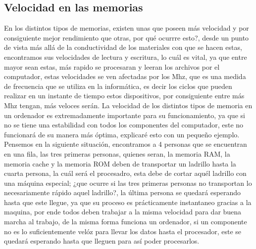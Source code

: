 \documentclass{article}
\begin{document}
\subsection{Velocidad en las memorias} 
En los distintos tipos de memorias, existen unas que poseen más velocidad y por consiguiente mejor rendimiento que otras, por qué ocurrre esto?, desde un punto de vista más allá de la conductividad de los materiales con que se hacen estas, encontramos sus velocidades de lectura y escritura, lo cuál es vital, ya que entre mayor sean estas, más rapido se procesaran y leeran los archivos por el computador, estas velocidades se ven afectadas por los Mhz, que es una medida de frecuencia que se utiliza en la informática, es decir los ciclos que pueden realizar en un instante de tiempo estos dispositivos, por consiguiente entre más Mhz tengan, más veloces serán. La velocidad de los distintos tipos de memoria en un ordenador es extremadamente importante para su funcionamiento, ya que si no se tiene una estabilidad con todos los componentes del computador, este no funcionará de su manera más óptima, explicaré esto con un pequeño ejemplo. Pensemos en la siguiente situación, encontramos a 4 personas que se encuentran en una fila, las tres primeras personas, quienes seran, la memoria RAM, la memoria cache y la memoria ROM deben de transportar un ladrillo hasta la cuarta persona, la cuál será el procesadro, esta debe de cortar aquél ladrillo con una máquina especial; ¿que ocurre si las tres primeras personas no transportan lo necesariamente rápido aquel ladrillo?, la última persona se quedará esperando hasta que este llegue, ya que su proceso es prácticamente instantaneo gracias a la maquina, por ende todos deben trabajar a la misma velocidad para dar buena marcha al trabajo, de la misma forma funciona un ordenador, si un componente no es lo suficientemente velóz para llevar los datos hasta el procesador, este se quedará esperando hasta que lleguen para así poder procesarlos.




\end{document}
